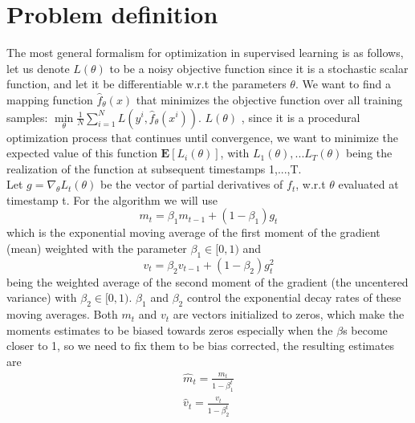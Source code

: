\documentclass[10pt,a4paper]{article}
\begin{document}
\section{Problem definition}

The most general formalism for optimization in supervised learning is as follows, let us denote $L(\theta)$ to be a noisy objective function since it is a stochastic scalar function, and let it be differentiable w.r.t the parameters $\theta$. 
We want to find a mapping function $\hat{f}_\theta (x)$ that minimizes the objective function over all training samples:
$\min \limits_{\theta} \frac{1}{N}\sum_{i=1}^{N} L(y^i, \hat{f}_\theta (x^i))$. $L(\theta)$ 
, since it is a procedural optimization process that continues until convergence, we want to minimize the expected value of this function $\mathbf{E}[L_i(\theta)]$, with $L_1(\theta), ...L_T(\theta)$ being the realization of the function at subsequent timestamps 1,...,T.\\
Let $g=\nabla_\theta L_t(\theta)$ be the vector of partial derivatives of $f_t$, w.r.t $\theta$ evaluated at timestamp t. For the algorithm we will use 
\begin{equation*}
    m_t=\beta_1m_{t-1}+(1-\beta_1)g_t
\end{equation*}
which is the exponential moving average of the first moment of the gradient (mean) weighted with the parameter $\beta_1\in[0,1)$ and 
\begin{equation*}
    v_t=\beta_2v_{t-1}+(1-\beta_2)g^2_t
\end{equation*}
being the weighted average of the second moment of the gradient (the uncentered variance) with $\beta_2\in[0,1)$. $\beta_1$ and $\beta_2$ control the exponential decay rates of these moving
averages.
Both $m_t$ and $v_t$ are vectors initialized to zeros, which make the moments estimates to be biased towards zeros especially when the $\beta$s become closer to 1, so we need to fix them to be bias corrected, the resulting estimates are 
\begin{equation*}
    \begin{split}
    \hat{m}_t=\frac{m_t}{1-\beta_1^t} \\ 
    \hat{v}_t=\frac{v_t}{1-\beta_2^t}
    \end{split}
\end{equation*}
\end{document}
